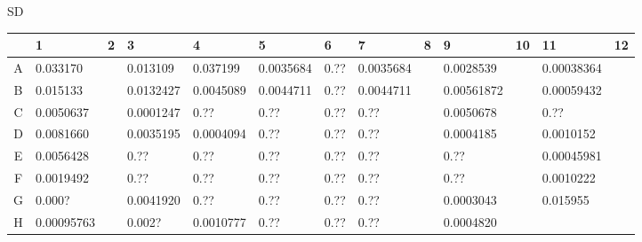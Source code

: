 \documentclass[UTF8,10pt,a4paper,fontset=fandol]{ctexart}
\begin{document}
\vspace{1em}
SD

\begin{center}
\scriptsize
\begin{tabular}{c|*{12}{p{0.62cm}|}}
 & 1 & 2 & 3 & 4 & 5 & 6 & 7 & 8 & 9 & 10 & 11 & 12\\ \hline
A &
\raggedright 0.033170 &
&
\raggedright 0.013109 &
\raggedright 0.037199 &
\raggedright 0.0035684 &
\raggedright 0.?? &
\raggedright 0.0035684 &
&
\raggedright 0.0028539 &
&
\raggedright 0.00038364 &
\\ \hline
B &
\raggedright 0.015133 &
&
\raggedright 0.0132427 &
\raggedright 0.0045089 &
\raggedright 0.0044711 &
\raggedright 0.?? &
\raggedright 0.0044711 &
&
\raggedright 0.00561872 &
&
\raggedright 0.00059432 &
\\ \hline
C &
\raggedright 0.0050637 &
&
\raggedright 0.0001247 &
\raggedright 0.?? &
\raggedright 0.?? &
\raggedright 0.?? &
\raggedright 0.?? &
&
\raggedright 0.0050678 &
&
\raggedright 0.?? &
\\ \hline
D &
\raggedright 0.0081660 &
&
\raggedright 0.0035195 &
\raggedright 0.0004094 &
\raggedright 0.?? &
\raggedright 0.?? &
\raggedright 0.?? &
&
\raggedright 0.0004185 &
&
\raggedright 0.0010152 &
\\ \hline
E &
\raggedright 0.0056428 &
&
\raggedright 0.?? &
\raggedright 0.?? &
\raggedright 0.?? &
\raggedright 0.?? &
\raggedright 0.?? &
&
\raggedright 0.?? &
&
\raggedright 0.00045981 &
\\ \hline
F &
\raggedright 0.0019492 &
&
\raggedright 0.?? &
\raggedright 0.?? &
\raggedright 0.?? &
\raggedright 0.?? &
\raggedright 0.?? &
&
\raggedright 0.?? &
&
\raggedright 0.0010222 &
\\ \hline
G &
\raggedright 0.000? &
&
\raggedright 0.0041920 &
\raggedright 0.?? &
\raggedright 0.?? &
\raggedright 0.?? &
\raggedright 0.?? &
&
\raggedright 0.0003043 &
&
\raggedright 0.015955 &
\\ \hline
H &
\raggedright 0.00095763 &
&
\raggedright 0.002? &
\raggedright 0.0010777 &
\raggedright 0.?? &
\raggedright 0.?? &
\raggedright 0.?? &
&
\raggedright 0.0004820 &
&
&
\\ \hline
\end{tabular}
\end{center}

\end{document}
